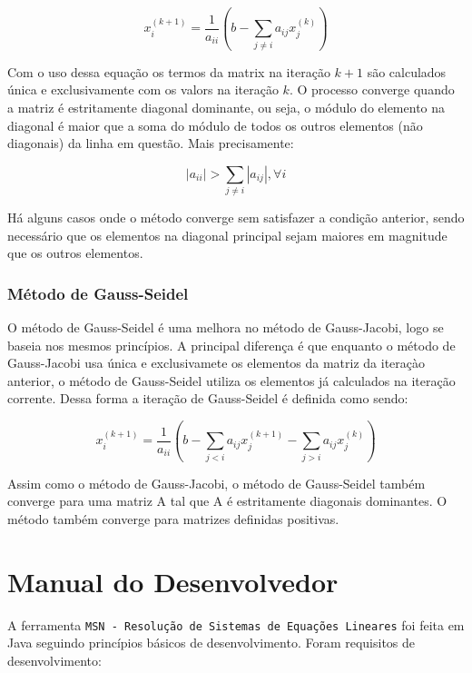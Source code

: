 \documentclass[a4paper,10pt]{report}
\newcommand{\ferramenta}{\texttt{MSN - Resolução de Sistemas de Equações Lineares}\xspace}
\begin{document}
\begin{equation*}
 x^{(k+1)}_{i}=\dfrac{1}{a_{ii}}(b-\sum_{j \neq i} a_{ij}x^{(k)}_{j})
\end{equation*}

Com o uso dessa equação os termos da matrix na iteração $k+1$ são calculados única e exclusivamente com os valors na iteração $k$. O processo converge quando a matriz é estritamente diagonal dominante, ou seja, o módulo do elemento na diagonal é maior que a soma do módulo de todos os outros elementos (não diagonais) da linha em questão. Mais precisamente:

\begin{equation*}
|a_{ii}| > \sum_{j \neq i}|a_{ij}| ,  \forall i
\end{equation*}

Há alguns casos onde o método converge sem satisfazer a condição anterior, sendo necessário que os elementos na diagonal principal sejam maiores em magnitude que os outros elementos.

\subsection{Método de Gauss-Seidel}

O método de Gauss-Seidel é uma melhora no método de Gauss-Jacobi, logo se baseia nos mesmos princípios. A principal diferença é que enquanto o método de Gauss-Jacobi usa única e exclusivamete os elementos da matriz da iteraçào anterior, o método de Gauss-Seidel utiliza os elementos já calculados na iteração corrente. Dessa forma a iteração de Gauss-Seidel é definida como sendo:

\begin{equation*}
 x^{(k+1)}_{i}=\dfrac{1}{a_{ii}}(b-\sum_{j < i} a_{ij}x^{(k+1)}_{j}-\sum_{j > i} a_{ij}x^{(k)}_{j})
\end{equation*}

Assim como o método de Gauss-Jacobi, o método de Gauss-Seidel também converge para uma matriz A tal que A é estritamente diagonais dominantes. O método também converge para matrizes definidas positivas.

\chapter{Manual do Desenvolvedor}
\label{desenvolvedor}

A ferramenta \ferramenta foi feita em Java seguindo princípios básicos de desenvolvimento. Foram requisitos de desenvolvimento:
\end{document}
